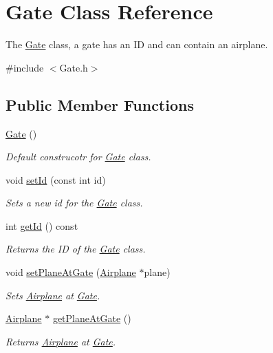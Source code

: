 \hypertarget{class_gate}{}\section{Gate Class Reference}
\label{class_gate}


The \mbox{\hyperlink{class_gate}{Gate}} class, a gate has an ID and can contain an airplane.  




{\ttfamily \#include $<$Gate.\+h$>$}

\subsection*{Public Member Functions}
\begin{DoxyCompactItemize}
\item 
\mbox{\hyperlink{class_gate_a4fc24ecebc0ca8252bf7ab96a705e58a}{Gate}} ()
\begin{DoxyCompactList}\small\item\em Default construcotr for \mbox{\hyperlink{class_gate}{Gate}} class. \end{DoxyCompactList}\item 
void \mbox{\hyperlink{class_gate_aa770ce8dbc324b0c44c1345bb1e77672}{set\+Id}} (const int id)
\begin{DoxyCompactList}\small\item\em Sets a new id for the \mbox{\hyperlink{class_gate}{Gate}} class. \end{DoxyCompactList}\item 
int \mbox{\hyperlink{class_gate_a9ba3d9aa4f60f5b97a1fb391b7490938}{get\+Id}} () const
\begin{DoxyCompactList}\small\item\em Returns the ID of the \mbox{\hyperlink{class_gate}{Gate}} class. \end{DoxyCompactList}\item 
void \mbox{\hyperlink{class_gate_ad0ff6bff604635299374ccb5b92169f9}{set\+Plane\+At\+Gate}} (\mbox{\hyperlink{class_airplane}{Airplane}} $\ast$plane)
\begin{DoxyCompactList}\small\item\em Sets \mbox{\hyperlink{class_airplane}{Airplane}} at \mbox{\hyperlink{class_gate}{Gate}}. \end{DoxyCompactList}\item 
\mbox{\hyperlink{class_airplane}{Airplane}} $\ast$ \mbox{\hyperlink{class_gate_ac27d4ca81274494a61abe0419428a204}{get\+Plane\+At\+Gate}} ()
\begin{DoxyCompactList}\small\item\em Returns \mbox{\hyperlink{class_airplane}{Airplane}} at \mbox{\hyperlink{class_gate}{Gate}}. \end{DoxyCompactList}\item 

\end{DoxyCompactItemize}
